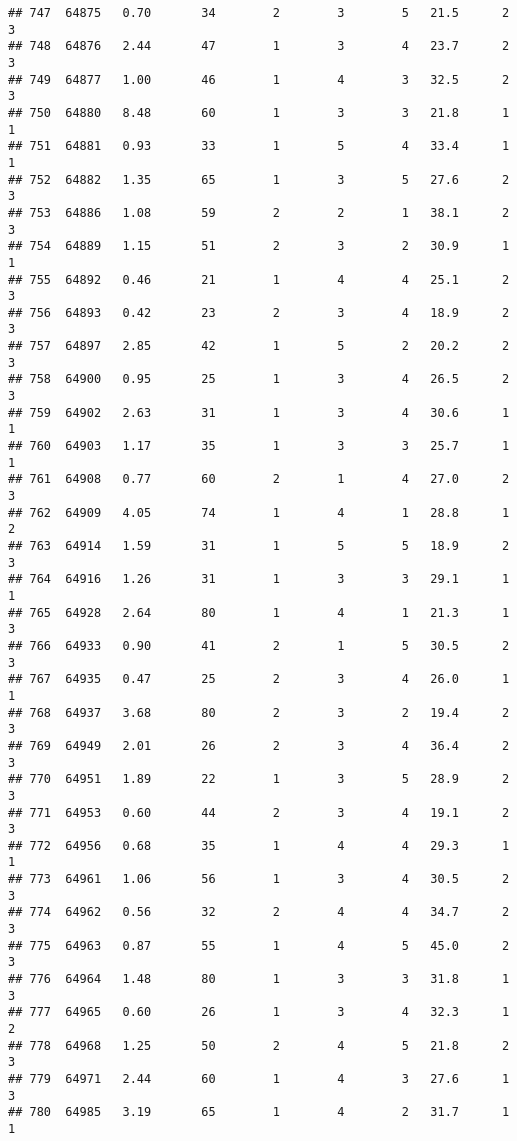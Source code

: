 \documentclass[
]{article}
\begin{document}
\begin{verbatim}
## 747  64875   0.70       34        2        3        5   21.5      2      3
## 748  64876   2.44       47        1        3        4   23.7      2      3
## 749  64877   1.00       46        1        4        3   32.5      2      3
## 750  64880   8.48       60        1        3        3   21.8      1      1
## 751  64881   0.93       33        1        5        4   33.4      1      1
## 752  64882   1.35       65        1        3        5   27.6      2      3
## 753  64886   1.08       59        2        2        1   38.1      2      3
## 754  64889   1.15       51        2        3        2   30.9      1      1
## 755  64892   0.46       21        1        4        4   25.1      2      3
## 756  64893   0.42       23        2        3        4   18.9      2      3
## 757  64897   2.85       42        1        5        2   20.2      2      3
## 758  64900   0.95       25        1        3        4   26.5      2      3
## 759  64902   2.63       31        1        3        4   30.6      1      1
## 760  64903   1.17       35        1        3        3   25.7      1      1
## 761  64908   0.77       60        2        1        4   27.0      2      3
## 762  64909   4.05       74        1        4        1   28.8      1      2
## 763  64914   1.59       31        1        5        5   18.9      2      3
## 764  64916   1.26       31        1        3        3   29.1      1      1
## 765  64928   2.64       80        1        4        1   21.3      1      3
## 766  64933   0.90       41        2        1        5   30.5      2      3
## 767  64935   0.47       25        2        3        4   26.0      1      1
## 768  64937   3.68       80        2        3        2   19.4      2      3
## 769  64949   2.01       26        2        3        4   36.4      2      3
## 770  64951   1.89       22        1        3        5   28.9      2      3
## 771  64953   0.60       44        2        3        4   19.1      2      3
## 772  64956   0.68       35        1        4        4   29.3      1      1
## 773  64961   1.06       56        1        3        4   30.5      2      3
## 774  64962   0.56       32        2        4        4   34.7      2      3
## 775  64963   0.87       55        1        4        5   45.0      2      3
## 776  64964   1.48       80        1        3        3   31.8      1      3
## 777  64965   0.60       26        1        3        4   32.3      1      2
## 778  64968   1.25       50        2        4        5   21.8      2      3
## 779  64971   2.44       60        1        4        3   27.6      1      3
## 780  64985   3.19       65        1        4        2   31.7      1      1

\end{verbatim}
\end{document}
